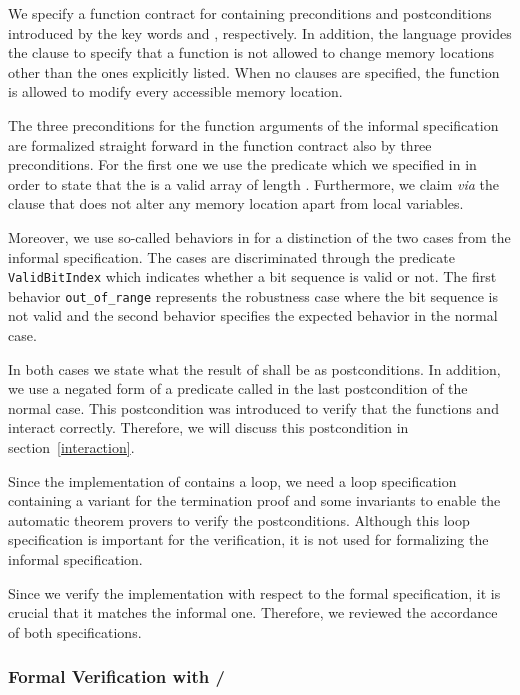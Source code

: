 We specify a function contract for \peek containing preconditions
and postconditions introduced by the key words 
and , respectively.
In addition, the \acsl language provides the  clause to specify 
that a function is not allowed to change memory locations other than the ones 
explicitly listed. 
When no  clauses are specified, 
the function is allowed to modify every accessible memory location. 

The three preconditions for the function arguments of the informal specification 
are formalized straight forward in the function contract also by three preconditions.
For the first one we use the predicate 
which we specified in \acsl in order to state that the 
is a valid array of length .
Furthermore, we claim {\it via} the  clause 
that \peek does not alter any memory location
apart from local variables.

Moreover, we use so-called behaviors in \acsl for a distinction of the two cases
from the informal specification.
The cases are discriminated through the predicate \texttt{ValidBitIndex}
which indicates whether a bit sequence is valid or not.
The first behavior \texttt{out\_of\_range} represents the robustness 
case where the bit sequence is not valid and 
the second behavior specifies the expected behavior in the normal case.

In both cases we state what the result of \peek shall be 
as postconditions. In addition, we use a negated form of
a predicate called  in the last postcondition of
the normal case. This postcondition was introduced to verify
that the functions \peek and \poke interact correctly.
Therefore, we will discuss this postcondition in section~\ref{interaction}.

Since the implementation of \peek contains a loop,
we need a loop specification containing a variant for the termination
proof and some invariants to enable the automatic theorem provers
to verify the postconditions.
Although this loop specification is important for the verification,
it is not used for formalizing the informal specification.

Since we verify the implementation with respect to the formal specification, 
it is crucial that it matches the informal one. 
Therefore, we reviewed the accordance of both specifications.

\subsubsection{Formal Verification with \framac/\wpframac}
\label{verification-peek}

